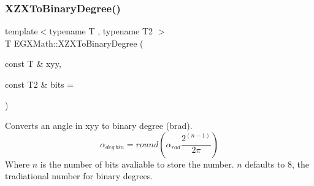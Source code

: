 \mbox{\label{group___e_g_x_math-_angle_conversions-_x_z_x_ga245f7fe63a1fec3b66d44f5ad07abc72}} 
\subsubsection{\texorpdfstring{X\+Z\+X\+To\+Binary\+Degree()}{XZXToBinaryDegree()}}
{\footnotesize\ttfamily template$<$typename T , typename T2 $>$ \\
T E\+G\+X\+Math\+::\+X\+Z\+X\+To\+Binary\+Degree (\begin{DoxyParamCaption}\item[{const T \&}]{xyy,  }\item[{const T2 \&}]{bits = {} }\end{DoxyParamCaption})}



Converts an angle in xyy to binary degree (brad). \[\alpha_{deg\ bin}=round(\alpha_{rad}\frac{2^{(n-1)}}{2 \pi})\] Where $n$ is the number of bits avaliable to store the number. $n$ defaults to 8, the tradiational number for binary degrees. 

